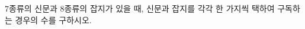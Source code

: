 \hspace*{2mm}\begin{minipage}[t]{\dimexpr\linewidth-2mm\relax}\vspace{0pt}
$7$종류의 신문과 $8$종류의 잡지가 있을 때, 신문과 잡지를 각각 한 가지씩 택하여 구독하는 경우의 수를 구하시오.\end{minipage}
